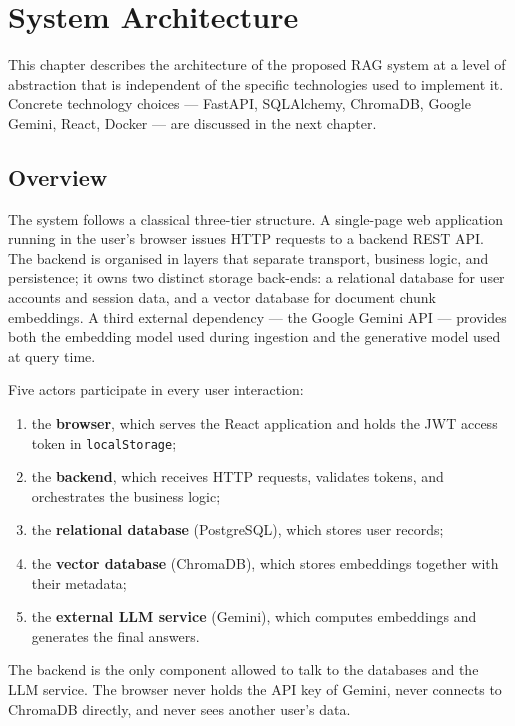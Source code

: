 \chapter{System Architecture}
\label{chap:architecture}

This chapter describes the architecture of the proposed RAG system at a
level of abstraction that is independent of the specific technologies used
to implement it. Concrete technology choices --- FastAPI, SQLAlchemy,
ChromaDB, Google Gemini, React, Docker --- are discussed in the next chapter.

\section{Overview}
\label{sec:architecture-overview}

The system follows a classical three-tier structure. A single-page web
application running in the user's browser issues HTTP requests to a backend
REST API. The backend is organised in layers that separate transport,
business logic, and persistence; it owns two distinct storage back-ends: a
relational database for user accounts and session data, and a vector
database for document chunk embeddings. A third external dependency --- the
Google Gemini API --- provides both the embedding model used during
ingestion and the generative model used at query time.

Five actors participate in every user interaction:

\begin{enumerate}
  \item the \textbf{browser}, which serves the React application and holds
        the JWT access token in \texttt{localStorage};
  \item the \textbf{backend}, which receives HTTP requests, validates
        tokens, and orchestrates the business logic;
  \item the \textbf{relational database} (PostgreSQL), which stores user
        records;
  \item the \textbf{vector database} (ChromaDB), which stores embeddings
        together with their metadata;
  \item the \textbf{external LLM service} (Gemini), which computes
        embeddings and generates the final answers.
\end{enumerate}

The backend is the only component allowed to talk to the databases and the
LLM service. The browser never holds the API key of Gemini, never connects
to ChromaDB directly, and never sees another user's data.

